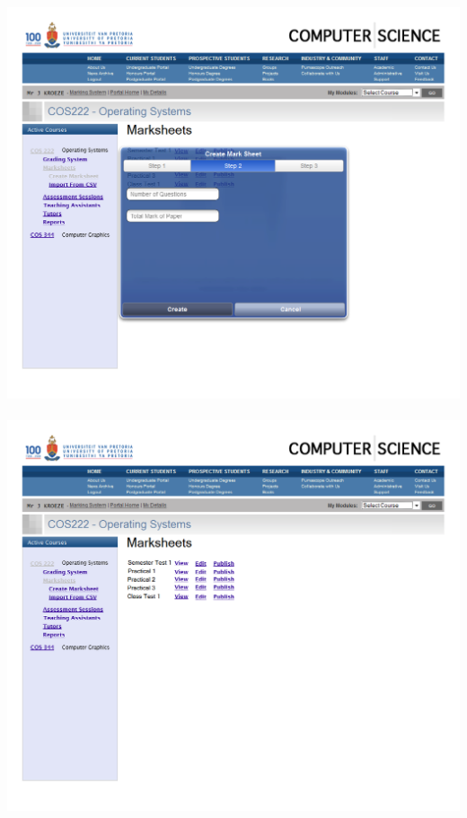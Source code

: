 \documentclass[12pt,a4paper]{article}
\begin{document}
\includegraphics[scale=0.3]{./WebUI/9.png}\\\\
\includegraphics[scale=0.3]{./WebUI/10.png}\\\\
\end{document}
